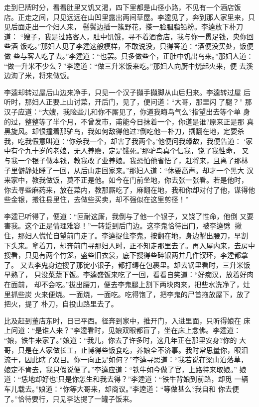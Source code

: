 走到巳牌时分，看看肚里又饥又渴，四下里都是山径小路，不见有一个酒店饭
店。正走之间，只见远远在山凹里露出两间草屋。李逵见了，奔到那人家里来，只
见后面走出一个妇人来，髻鬓边插一簇野花，搽一脸胭脂铅粉。李逵放下朴刀道：
“嫂子，我是过路客人，肚中饥饿，寻不着酒食店，我与你一贯足钱，央你回些酒
饭吃。”那妇人见了李逵这般模样，不敢说没，只得答道：“酒便没买处，饭便做
些与客人吃了去。”李逵道：“也罢。只多做些个，正肚中饥出鸟来。”那妇人道：
“做一升米不少么？”李逵道：“做三升米饭来吃。”那妇人向厨中烧起火来，便
去溪边淘了米，将来做饭。

李逵却转过屋后山边来净手，只见一个汉子攧手攧脚从山后归来。李逵转过屋
后听时，那妇人正要上山讨菜，开后门，见了，便问道：“大哥，那里闪了腿？”
那汉子应道：“大嫂，我险些儿和你不厮见了，你道我晦鸟气么?指望出去等个单
身的过，整整等了半个月，不曾发市，甫能今日抹着一个，你道是谁?原来正是那
真黑旋风。却恨撞着那驴鸟，我如何敌得他过?倒吃他一朴刀，搠翻在地，定要杀
我，吃我假意叫道：‘你杀我一个，却害了我两个。’他便问我缘故，我便告道：
‘家中有个九十岁的老娘，无人养赡，定是饿死。’那驴鸟真个信我，饶了我性命，
又与我一个银子做本钱，教我改了业养娘。我恐怕他省悟了，赶将来，且离了那林
子里僻静处睡了一回，从后山走回家来。”那妇人道：“休要高声。却才一个黑大
汉来家中，教我做饭，莫不正是他。如今在门前坐地，你去张一张看。若是他时，
你去寻些麻药来，放在菜内，教那厮吃了，麻翻在地，我和你却对付了他，谋得他
些金银，搬往县里住，去做些买卖，却不强似在这里剪径！”

李逵已听得了，便道：“叵耐这厮，我倒与了他一个银子，又饶了性命，他倒
又要害我。这个正是情理难容！”一转踅到后门边。这李鬼恰待出门，被李逵劈
揪住，那妇人慌忙自望前门走了。李逵捉住李鬼，按翻在地，身边掣出腰刀，早割
下头来。拿着刀，却奔前门寻那妇人时，正不知走那里去了。再入屋内来，去房中
搜看，只见有两个竹笼，盛些旧衣裳，底下搜得些碎银两并几件钗环，李逵都拿了。
又去李鬼身边搜了那锭小银子，都打缚在包裹里。却去锅里看时，三升米饭早熟了，
只没菜蔬下饭。李逵盛饭来吃了一回，看看自笑道：“好痴汉，放着好肉在面前，
却不会吃。”拔出腰刀，便去李鬼腿上割下两块肉来，把些水洗净了，灶里抓些炭
火来便烧。一面烧，一面吃。吃得饱了，把李鬼的尸首拖放屋下，放了把火，提了
朴刀，自投山路里去了。

比及赶到董店东时，日已平西。径奔到家中，推开门，入进里面，只听得娘在
床上问道：“是谁人来？”李逵看时，见娘双眼都盲了，坐在床上念佛。李逵道：
“娘，铁牛来家了。”娘道：“我儿，你去了许多时，这几年正在那里安身?你的
大哥，只是在人家做长工，止博得些饭食吃，养娘全不济事。我时常思量你，眼泪
流干，因此瞎了双目。你一向正是如何？”李逵寻思道：“我若说在梁山泊落草，
娘定不肯去，我只假说便了。”李逵应道：“铁牛如今做了官，上路特来取娘。”
娘道：“恁地却好也!只是你怎生和我去得？”李逵道：“铁牛背娘到前路，却觅
一辆车儿载去。”娘道：“你等大哥来，却商议。”李逵道：“等做甚么?我自和
你去便了。”恰待要行，只见李达提了一罐子饭来。

